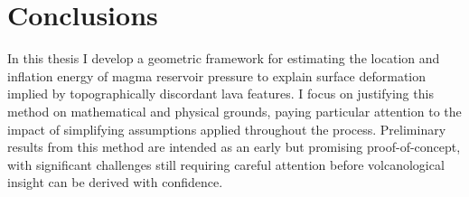 \chapter{Conclusions}

In this thesis I develop a geometric framework for estimating the location and inflation energy of magma reservoir pressure to explain surface deformation implied by topographically discordant lava features. I focus on justifying this method on mathematical and physical grounds, paying particular attention to the impact of simplifying assumptions applied throughout the process. Preliminary results from this method are intended as an early but promising proof-of-concept, with significant challenges still requiring careful attention before volcanological insight can be derived with confidence.